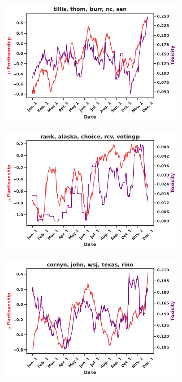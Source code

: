 \begin{figure}
\begin{subfigure}[l]{0.32\textwidth}
\caption{}
\label{fig:brat}
\end{subfigure}
\begin{subfigure}[l]{0.32\textwidth}
\includegraphics[width=1\columnwidth]{figures/tillis-conservative-final-20240425.pdf} 
\caption{}
\label{fig:tillis}
\end{subfigure}
\begin{subfigure}[l]{0.32\textwidth}
\includegraphics[width=1\columnwidth]{figures/rank-conservative-final-20240425.pdf} 
\caption{}
\label{fig:rank}
\end{subfigure}
\begin{subfigure}[l]{0.32\textwidth}
\includegraphics[width=1\columnwidth]{figures/cornyn-conservative-final-20240425.pdf} 

\end{subfigure}
\end{figure}
